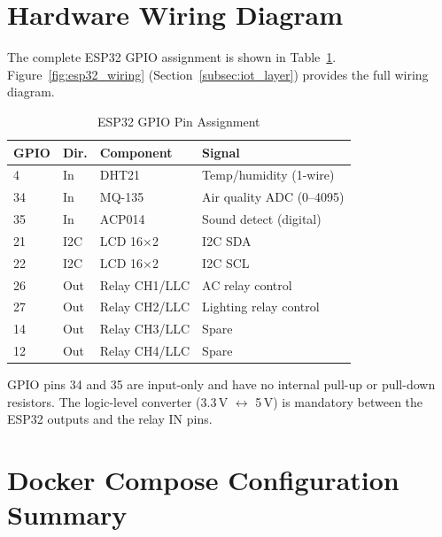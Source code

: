 \section{Hardware Wiring Diagram}
\label{app:wiring}

The complete ESP32 GPIO assignment is shown in Table~\ref{tab:app_gpio}.
Figure~\ref{fig:esp32_wiring} (Section~\ref{subsec:iot_layer}) provides
the full wiring diagram.

\begin{table}[H]
\centering
\caption{ESP32 GPIO Pin Assignment}
\label{tab:app_gpio}
\begin{tabular}{@{}p{1.0cm}p{1.5cm}p{2.2cm}p{3.0cm}@{}}
\toprule
\textbf{GPIO} & \textbf{Dir.} & \textbf{Component} & \textbf{Signal} \\
\midrule
4  & In  & DHT21        & Temp/humidity (1-wire) \\
34 & In  & MQ-135       & Air quality ADC (0--4095) \\
35 & In  & ACP014       & Sound detect (digital) \\
21 & I2C & LCD 16×2     & I2C SDA \\
22 & I2C & LCD 16×2     & I2C SCL \\
26 & Out & Relay CH1/LLC & AC relay control \\
27 & Out & Relay CH2/LLC & Lighting relay control \\
14 & Out & Relay CH3/LLC & Spare \\
12 & Out & Relay CH4/LLC & Spare \\
\bottomrule
\end{tabular}
\end{table}

GPIO pins 34 and 35 are input-only and have no internal pull-up or
pull-down resistors.  The logic-level converter (3.3\,V $\leftrightarrow$
5\,V) is mandatory between the ESP32 outputs and the relay IN pins.

\section{Docker Compose Configuration Summary}
\label{app:docker}

